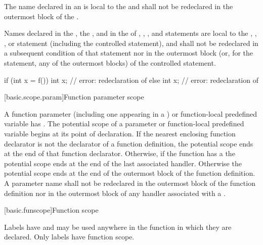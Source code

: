 \pnum
{}%
The name declared in an 
is local to the
 and shall not be redeclared in the outermost block of the
.

\pnum
Names declared in the , the , and in the
 of , , , and
 statements are local to the , ,
, or  statement (including the controlled
statement), and shall not be redeclared in a subsequent condition of
that statement nor in the outermost block (or, for the 
statement, any of the outermost blocks) of the controlled statement.
\begin{example}
\begin{codeblock}
if (int x = f()) {
  int x;            // error: redeclaration of 
}
else {
  int x;            // error: redeclaration of 
}
\end{codeblock}
\end{example}

[basic.scope.param]{Function parameter scope}

\pnum
{}%
%
%
A function parameter
(including one appearing in a
)
or function-local predefined variable
has .
The potential scope of a parameter
or function-local predefined variable
begins at its point of declaration. If
the nearest enclosing function declarator
is not the declarator of a function definition,
the potential scope ends at the end of that function declarator.
Otherwise, if
the function has a  the potential scope
ends at the end of the last associated handler.
Otherwise the potential scope ends
at the end of the outermost block of the function definition. A
parameter name shall not be redeclared in the outermost block of the
function definition nor in the outermost block of any handler associated
with a .

[basic.funscope]{Function scope}

\pnum
{}%
Labels have  and
may be used anywhere in the function in which they are declared. Only
labels have function scope.

